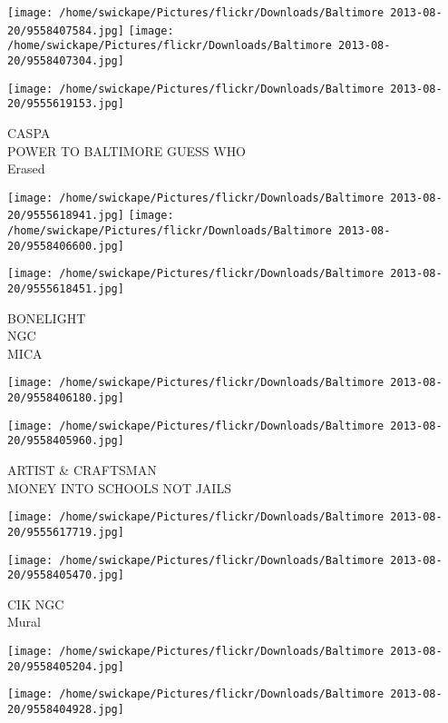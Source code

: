 \documentclass[10pt,letterpaper]{article}
\begin{document}
\texttt{[image: /home/swickape/Pictures/flickr/Downloads/Baltimore 2013-08-20/9558407584.jpg]}
\texttt{[image: /home/swickape/Pictures/flickr/Downloads/Baltimore 2013-08-20/9558407304.jpg]}

\vspace{0.25in}
\texttt{[image: /home/swickape/Pictures/flickr/Downloads/Baltimore 2013-08-20/9555619153.jpg]}

CASPA\\
POWER TO BALTIMORE GUESS WHO\\
Erased\\
\pagebreak

\texttt{[image: /home/swickape/Pictures/flickr/Downloads/Baltimore 2013-08-20/9555618941.jpg]}
\texttt{[image: /home/swickape/Pictures/flickr/Downloads/Baltimore 2013-08-20/9558406600.jpg]}

\texttt{[image: /home/swickape/Pictures/flickr/Downloads/Baltimore 2013-08-20/9555618451.jpg]}

BONELIGHT\\
NGC\\
MICA\\
\pagebreak

\texttt{[image: /home/swickape/Pictures/flickr/Downloads/Baltimore 2013-08-20/9558406180.jpg]}

\vspace{0.25in}
\texttt{[image: /home/swickape/Pictures/flickr/Downloads/Baltimore 2013-08-20/9558405960.jpg]}

ARTIST \& CRAFTSMAN\\
MONEY INTO SCHOOLS NOT JAILS\\
\pagebreak

\texttt{[image: /home/swickape/Pictures/flickr/Downloads/Baltimore 2013-08-20/9555617719.jpg]}

\vspace{0.25in}
\texttt{[image: /home/swickape/Pictures/flickr/Downloads/Baltimore 2013-08-20/9558405470.jpg]}

CIK NGC\\
Mural\\
\pagebreak

\texttt{[image: /home/swickape/Pictures/flickr/Downloads/Baltimore 2013-08-20/9558405204.jpg]}

\vspace{0.25in}
\texttt{[image: /home/swickape/Pictures/flickr/Downloads/Baltimore 2013-08-20/9558404928.jpg]}
\end{document}
